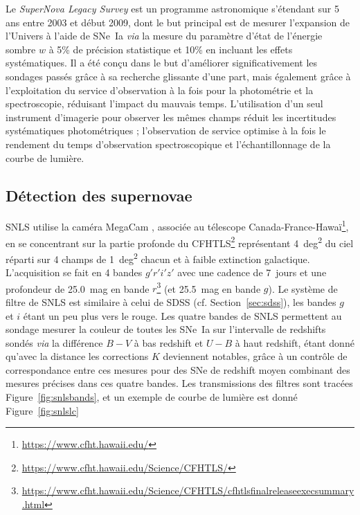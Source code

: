 \documentclass[../main/main.tex]{subfiles}
\begin{document}
Le \textit{SuperNova Legacy Survey} \citep[SNLS,][]{astier2006, sullivan2011}
est un programme astronomique s'étendant sur 5 ans entre 2003 et début 2009,
dont le but principal est de mesurer l'expansion de l'Univers à l'aide de SNe~Ia
\textit{via} la mesure du paramètre d'état de l'énergie sombre $w$ à 5\% de
précision statistique et 10\% en incluant les effets systématiques. Il a été
conçu dans le but d'améliorer significativement les sondages passés grâce à sa
recherche glissante d'une part, mais également grâce à l'exploitation du service
d'observation à la fois pour la photométrie et la spectroscopie, réduisant
l'impact du mauvais temps. L'utilisation d'un seul instrument d'imagerie pour
observer les mêmes champs réduit les incertitudes systématiques photométriques ;
l'observation de service optimise à la fois le rendement du temps d'observation
spectroscopique et l'échantillonnage de la courbe de lumière.

\subsection{Détection des supernovae}\label{ssec:snlsdetec}

SNLS utilise la caméra MegaCam \citep{boulade2003}, associée au télescope
Canada-France-Hawaï\footnote{\href{https://www.cfht.hawaii.edu/}
{https://www.cfht.hawaii.edu/}}, en se concentrant sur la partie profonde du
CFHTLS\footnote{\href{https://www.cfht.hawaii.edu/Science/CFHTLS/}
{https://www.cfht.hawaii.edu/Science/CFHTLS/}} représentant \SI{4}{deg^2} du
ciel réparti sur 4 champs de \SI{1}{deg^2} chacun et à faible extinction
galactique. L'acquisition se fait en 4 bandes $g'r'i'z'$ avec une cadence de
\SI{7}{jours} et une profondeur de \SI{25,0}{mag} en bande
$r$\footnote{\href{https://www.cfht.hawaii.edu/Science/CFHTLS/cfhtlsfinalreleaseexecsummary.html}
{https://www.cfht.hawaii.edu/Science/CFHTLS/cfhtlsfinalreleaseexecsummary.html}}
(et \SI{25,5}{mag} en bande $g$). Le système de filtre de SNLS est similaire à
celui de SDSS (cf. Section~\ref{sec:sdss}), les bandes $g$ et $i$ étant un peu
plus vers le rouge. Les quatre bandes de SNLS permettent au sondage mesurer la
couleur de toutes les SNe~Ia sur l'intervalle de redshifts sondés \textit{via}
la différence $B-V$ à bas redshift et $U-B$ à haut redshift, étant donné qu'avec
la distance les corrections $K$ deviennent notables, grâce à un contrôle de
correspondance entre ces mesures pour des SNe de redshift moyen combinant des
mesures précises dans ces quatre bandes. Les transmissions des
filtres sont tracées Figure~\ref{fig:snlsbands}, et un exemple de courbe de
lumière est donné Figure~\ref{fig:snlslc}
\end{document}
